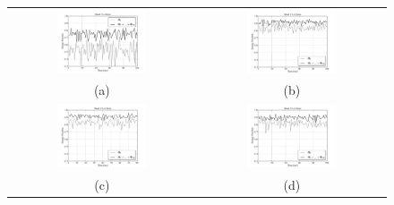 \documentclass[10pt,fleqn,a4paper]{article}
\begin{document}
\begin{figure}[h]
\begin{tabular}{cc}
 \includegraphics[width=0.5\textwidth]{./imgs/energy1.pdf} & \includegraphics[width=0.5\textwidth]{./imgs/energy2.pdf} \\
(a) & (b) \\
 \includegraphics[width=0.5\textwidth]{./imgs/energy3.pdf} & \includegraphics[width=0.5\textwidth]{./imgs/energy4.pdf} \\
(c) & (d) \\

\end{tabular}
\end{figure}
\end{document}
